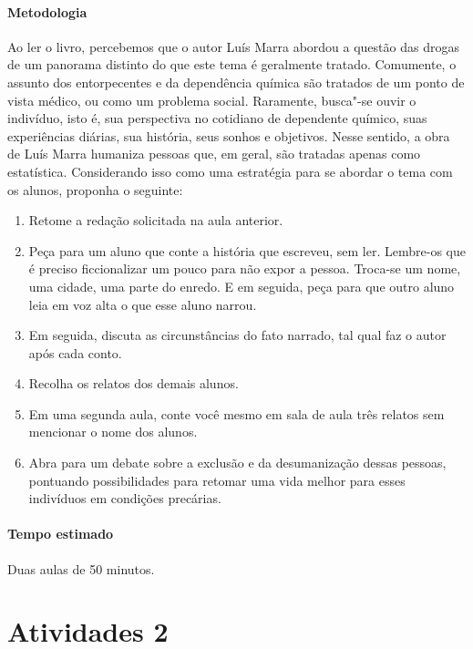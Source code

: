 \documentclass[12pt]{extarticle}
\begin{document}
\paragraph{Metodologia}
	Ao ler o livro, percebemos que o autor Luís Marra abordou a
	questão das drogas de um panorama distinto do que este tema é geralmente
	tratado. Comumente, o assunto dos entorpecentes e da dependência química
	são tratados de um ponto de vista médico, ou como um problema social.
	Raramente, busca"-se ouvir o indivíduo, isto é, sua perspectiva no
	cotidiano de dependente químico, suas experiências diárias, sua
	história, seus sonhos e objetivos. Nesse sentido, a obra de Luís Marra
	humaniza pessoas que, em geral, são tratadas apenas como estatística. 
	Considerando isso como uma estratégia para se abordar o tema 
	com os alunos, proponha o seguinte: 
\begin{enumerate}
	\item Retome a redação solicitada na aula anterior. 
	\item Peça para um aluno que conte a história que escreveu, sem ler. 
	Lembre-os que é preciso ficcionalizar um pouco para não expor a pessoa. 
	Troca-se um nome, uma cidade, uma parte do enredo. 
	E em seguida, peça para que outro aluno leia em voz alta o que 
	esse aluno narrou.
	\item Em seguida, discuta as circunstâncias do fato narrado, 
	tal qual faz o autor após cada conto. 
	\item Recolha os relatos dos demais alunos. 
	\item Em uma segunda aula, conte você mesmo em sala de aula 
	três relatos sem mencionar o nome dos alunos. 
	\item Abra para um debate sobre a exclusão e da desumanização 
	dessas pessoas, pontuando possibilidades para retomar uma vida 
	melhor para esses indivíduos em condições precárias.
\end{enumerate}
\paragraph{Tempo estimado} Duas aulas de 50 minutos. 

\section{Atividades 2}

\end{document}
